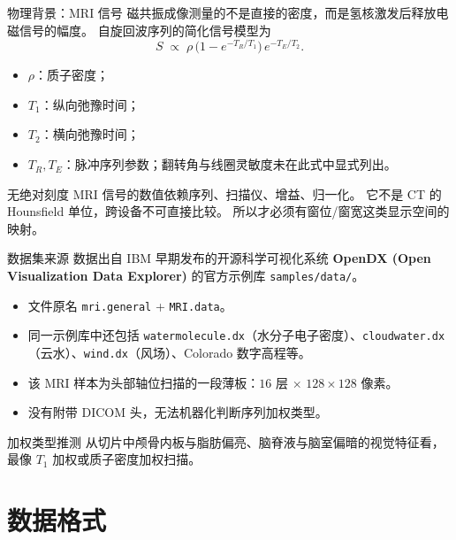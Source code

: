 \documentclass[aspectratio=169,11pt]{ctexbeamer}
\begin{document}
\begin{frame}{物理背景：MRI 信号}
  \small
  磁共振成像测量的不是直接的密度，而是氢核激发后释放电磁信号的幅度。
  自旋回波序列的简化信号模型为
  \[
    S\;\propto\;\rho\,\bigl(1-e^{-T_R/T_1}\bigr)\,e^{-T_E/T_2}.
  \]

  \begin{itemize}
    \item $\rho$：质子密度；
    \item $T_1$：纵向弛豫时间；
    \item $T_2$：横向弛豫时间；
    \item $T_R, T_E$：脉冲序列参数；翻转角与线圈灵敏度未在此式中显式列出。
  \end{itemize}

  \begin{block}{无绝对刻度}
    MRI 信号的数值依赖序列、扫描仪、增益、归一化。
    它不是 CT 的 Hounsfield 单位，跨设备不可直接比较。
    所以才必须有窗位/窗宽这类显示空间的映射。
  \end{block}
\end{frame}

\begin{frame}{数据集来源}
  \small
  数据出自 IBM 早期发布的开源科学可视化系统 \textbf{OpenDX (Open Visualization Data Explorer)} 的官方示例库 \texttt{samples/data/}。

  \begin{itemize}
    \item 文件原名 \texttt{mri.general} + \texttt{MRI.data}。
    \item 同一示例库中还包括 \texttt{watermolecule.dx}（水分子电子密度）、\texttt{cloudwater.dx}（云水）、\texttt{wind.dx}（风场）、Colorado 数字高程等。
    \item 该 MRI 样本为头部轴位扫描的一段薄板：$16$ 层 $\times$ $128\times128$ 像素。
    \item 没有附带 DICOM 头，无法机器化判断序列加权类型。
  \end{itemize}

  \begin{block}{加权类型推测}
    从切片中颅骨内板与脂肪偏亮、脑脊液与脑室偏暗的视觉特征看，最像 $T_1$ 加权或质子密度加权扫描。
  \end{block}
\end{frame}

\section{数据格式}
\end{document}
